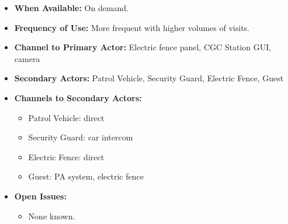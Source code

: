 \documentclass[12pt]{article}
\begin{document}
\begin{itemize}
        \item[]\textbf{When Available:}
            On demand.

        \item[]\textbf{Frequency of Use:}
            More frequent with higher volumes of visits.
            
        \item[]\textbf{Channel to Primary Actor:}
            Electric fence panel, CGC Station GUI, camera 

        \item[]\textbf{Secondary Actors:}
            Patrol Vehicle, Security Guard, Electric Fence, Guest
            
        \item[]\textbf{Channels to Secondary Actors:}
            \begin{itemize}
                \item[] Patrol Vehicle: direct
                \item[] Security Guard: car intercom
                \item[] Electric Fence: direct
                \item[] Guest: PA system, electric fence
            \end{itemize}

        \item[]\textbf{Open Issues:}
            \begin{itemize}
                \item[] None known.
            \end{itemize}
    \end{itemize}
     
\end{document}
